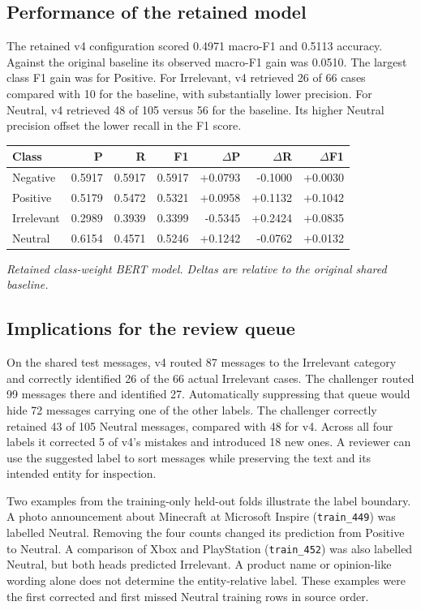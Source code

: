 \subsection{Performance of the retained model}
The retained v4 configuration scored 0.4971 macro-F1 and 0.5113 accuracy. Against the original baseline its observed macro-F1 gain was 0.0510. The largest class F1 gain was for Positive. For Irrelevant, v4 retrieved 26 of 66 cases compared with 10 for the baseline, with substantially lower precision. For Neutral, v4 retrieved 48 of 105 versus 56 for the baseline. Its higher Neutral precision offset the lower recall in the F1 score.
\begin{center}\begin{minipage}{\linewidth}\centering\small
\begin{tabular}{lrrrrrr}
\toprule
Class & P & R & F1 & $\Delta$P & $\Delta$R & $\Delta$F1 \\
\midrule
Negative & 0.5917 & 0.5917 & 0.5917 & +0.0793 & -0.1000 & +0.0030 \\
Positive & 0.5179 & 0.5472 & 0.5321 & +0.0958 & +0.1132 & +0.1042 \\
Irrelevant & 0.2989 & 0.3939 & 0.3399 & -0.5345 & +0.2424 & +0.0835 \\
Neutral & 0.6154 & 0.4571 & 0.5246 & +0.1242 & -0.0762 & +0.0132 \\
\bottomrule
\end{tabular}
\par\smallskip\textit{Retained class-weight BERT model. Deltas are relative to the original shared baseline.}
\end{minipage}\end{center}

\subsection{Implications for the review queue}
On the shared test messages, v4 routed 87 messages to the Irrelevant category and correctly identified 26 of the 66 actual Irrelevant cases. The challenger routed 99 messages there and identified 27. Automatically suppressing that queue would hide 72 messages carrying one of the other labels. The challenger correctly retained 43 of 105 Neutral messages, compared with 48 for v4. Across all four labels it corrected 5 of v4's mistakes and introduced 18 new ones. A reviewer can use the suggested label to sort messages while preserving the text and its intended entity for inspection.

Two examples from the training-only held-out folds illustrate the label boundary. A photo announcement about Minecraft at Microsoft Inspire (\texttt{train\_449}) was labelled Neutral. Removing the four counts changed its prediction from Positive to Neutral. A comparison of Xbox and PlayStation (\texttt{train\_452}) was also labelled Neutral, but both heads predicted Irrelevant. A product name or opinion-like wording alone does not determine the entity-relative label. These examples were the first corrected and first missed Neutral training rows in source order.
